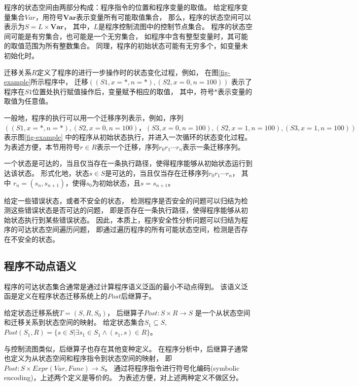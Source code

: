 程序的状态空间由两部分构成：程序指令的位置和程序变量的取值。
给定程序变量集合$Var$，用符号$\textbf{Var}$表示变量所有可能取值集合，
那么，程序的状态空间可以表示为$S = L \times \textbf{Var}$，
其中，$L$是程序控制流图中的控制节点集合。
程序的状态空间可能是有穷集合，也可能是一个无穷集合，
如程序中含有整型变量时，其可能的取值范围为所有整数集合。
同理，程序的初始状态可能有无穷多个，如变量未初始化时。

迁移关系$R$定义了程序的进行一步操作时的状态变化过程，例如，
在图\ref{fig-example}所示程序中，
迁移$((S1, x=*, n=*), (S2, x=0, n=100))$
表示了程序在$S1$位置处执行赋值操作后，变量赋予相应的取值，
其中，符号$*$表示变量的取值为任意值。

一般地，程序的执行可以用一个迁移序列表示，例如，序列
$((S1, x=*, n=*), (S2, x=0, n=100)，
(S3, x=0, n=100), (S2, x=1, n=100),
(S3, x=1, n=100) )$表示图\ref{fig-example}
中的程序从初始状态执行，并进入一次循环的状态变化过程。
为表述方便，本节用符号$r\in R$表示一个迁移，序列$r_0 r_1 \cdots r_n$表示一条迁移序列。

一个状态是可达的，当且仅当存在一条执行路径，使得程序能够从初始状态运行到达该状态。
形式化地，状态$s\in S$是可达的，当且仅当存在迁移序列$r_0 r_1 \cdots r_n$，
其中 $r_n = (s_n, s_{n+1})$，使得$s_0$为初始状态，且$s = s_{n+1}$。

给定一些错误状态，或者不安全的状态，
检测程序是否安全的问题可以归结为检测这些错误状态是否可达的问题，
即是否存在一条执行路径，使得程序能够从初始状态执行到某些错误状态。
因此，本质上，程序安全性分析问题可以归结为程序的可达状态空间遍历问题，
即通过遍历程序的所有可能状态空间，检测是否存在不安全的状态。


\subsection{程序不动点语义}

程序的可达状态集合通常是通过计算程序语义泛函的最小不动点得到。
该语义泛函是定义在程序状态迁移系统上的$Post$后继算子。


\begin{definition}
给定状态迁移系统$T=(S,R,S_0)$，
后继算子$Post: S \times R \rightarrow S$
是一个从状态空间和迁移关系到状态空间的映射。
给定状态集合$S_1 \subseteq S$,
$Post(S_1, R) = \{ s\in S | \exists s_1 \in S_1 \wedge (s_1, s)\in R \}$。
\end{definition}

与控制流图类似，后继算子也存在其他变种定义。
在程序分析中，后继算子通常也定义为从状态空间和程序指令到状态空间的映射，
即$Post: S \times Expr(Var, Func) \rightarrow S$。
通过将程序指令进行符号化编码(symbolic encoding)，上述两个定义是等价的。
为表述方便，对上述两种定义不做区分。

